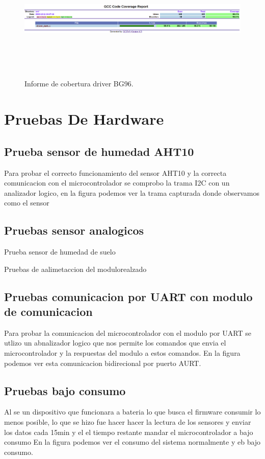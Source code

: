 \begin{figure}[htbp!]
    \centering
      \includegraphics[width=\linewidth, height=6cm]{./Figures/cobertura_bg96.png}
    \caption{Informe de cobertura driver BG96.}
      \label{fig:Cobertura BG96}
\end{figure}
  

\vspace{4cm} 
\section{Pruebas De Hardware}
\subsection{Prueba sensor de humedad AHT10}
Para probar el correcto funcionamiento del sensor AHT10 y la correcta comunicacion con el microcontrolador se comprobo la trama I2C con un analizador logico,
en la figura podemos ver la trama capturada donde observamos como el sensor 

\subsection{Pruebas sensor analogicos}
Prueba sensor de humedad de suelo

Pruebas de aalimetaccion del modulorealzado

\subsection{Pruebas comunicacion por UART con modulo de comunicacion}

Para probar la comunicacion del microcontrolador con el modulo por UART se utlizo un abnalizador logico que nos permite los comandos que envia el microcontrolador y la respuestas del modulo a estos comandos.
En la figura podemos ver esta comunicacion bidirecional por puerto AURT.
\subsection{Pruebas bajo consumo }
Al se un dispositivo que funcionara a bateria lo que busca el firmware consumir lo menos posible, lo que se hizo fue hacer hacer la lectura de los sensores y enviar los datos cada 15min y el el tiempo restante mandar el microcontrolador a bajo consumo 
En la figura podemos ver el consumo del sistema normalmente y eb bajo consumo.



